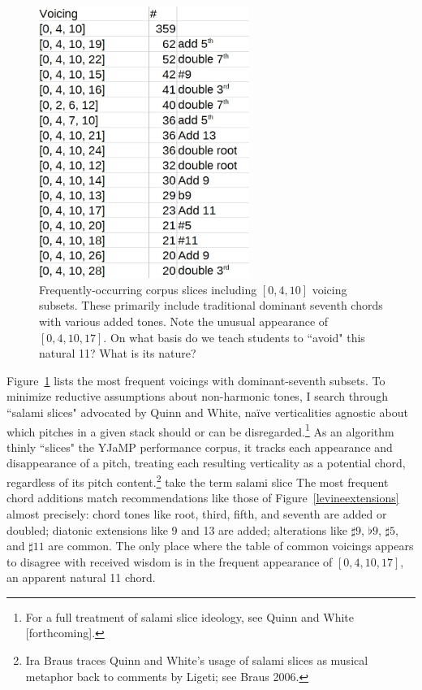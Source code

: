 \begin{figure}
	\centering
	\includegraphics[width=2.7in]{0410_tones.jpg}
	\caption{Frequently-occurring corpus slices including $[0,4,10]$ voicing subsets.  These primarily include traditional dominant seventh chords with various added tones.  Note the unusual appearance of $[0,4,10,17]$.  On what basis do we teach students to ``avoid" this natural 11?  What is its nature?}
	\label{[0,4,10]}
\end{figure}

Figure~\ref{[0,4,10]} lists the most frequent voicings with dominant-seventh subsets.  To minimize reductive assumptions about non-harmonic tones, I search through ``salami slices" advocated by Quinn and White, na\"{i}ve verticalities agnostic about which pitches in a given stack should or can be disregarded.\footnote{For a full treatment of salami slice ideology, see Quinn and White [forthcoming].}  As an algorithm thinly ``slices" the YJaMP performance corpus, it tracks each appearance and disappearance of a pitch, treating each resulting verticality as a potential chord, regardless of its pitch content.\footnote{Ira Braus traces Quinn and White's usage of salami slices as musical metaphor back to comments by Ligeti; see Braus 2006.} take the term salami slice The most frequent chord additions match recommendations like those of Figure~\ref{levineextensions} almost precisely: chord tones like root, third, fifth, and seventh are added or doubled; diatonic extensions like 9 and 13 are added; alterations like $\sharp 9$, $\flat 9$, $\sharp 5$, and $\sharp 11$ are common.  The only place where the table of common voicings appears to disagree with received wisdom is in the frequent appearance of $[0,4,10,17]$, an apparent natural 11 chord.

